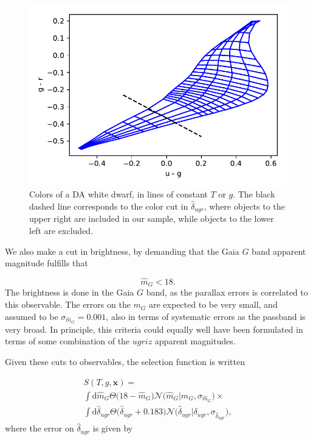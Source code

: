 \documentclass[fleqn,usenatbib]{mnras}
\newcommand{\Teff}{T}
\newcommand{\logg}{g}
\newcommand{\de}{\text{d}}
\begin{document}
\begin{figure}
	\includegraphics[width=\columnwidth]{colors_cut.pdf}
    \caption{Colors of a DA white dwarf, in lines of constant $\Teff$ or $\logg$. The black dashed line corresponds to the color cut in $\hat{\delta}_{ugr}$, where objects to the upper right are included in our sample, while objects to the lower left are excluded.}
    \label{fig:colors_cut}
\end{figure}

We also make a cut in brightness, by demanding that the Gaia $G$ band apparent magnitude fulfills that

\begin{equation}
	\hat{m}_G < 18.
\end{equation}
The brightness is done in the Gaia $G$ band, as the parallax errors is correlated to this observable. The errors on the $m_G$ are expected to be very small, and assumed to be $\sigma_{\hat{m}_G}=0.001$, also in terms of systematic errors as the passband is very broad. In principle, this criteria could equally well have been formulated in terms of some combination of the $ugriz$ apparent magnitudes.

Given these cuts to observables, the selection function is written

\begin{equation}\label{eq:selection}
\begin{split}
	S(\Teff,\logg,\mathbf{x}) = \\
    \int \de \hat{m}_G \Theta \big( 18-\hat{m}_G \big)\mathcal{N}\big( \hat{m}_G | m_G,\sigma_{\hat{m}_G} \big) \times \\
    \int \de \hat{\delta}_{ugr} \Theta \big( \hat{\delta}_{ugr}+0.183 \big) \mathcal{N}\big( \hat{\delta}_{ugr} | \delta_{ugr},\sigma_{\hat{\delta}_{ugr}}\big),
\end{split}
\end{equation}
where the error on $\hat{\delta}_{ugr}$ is given by
\end{document}
